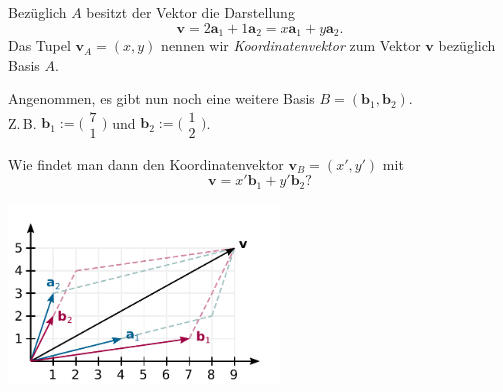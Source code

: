 \documentclass[9pt]{beamer}
\newcommand{\bv}[1]{\mathbf{#1}}
\newcommand{\icol}[1]{
  \big(\!\begin{smallmatrix}#1\end{smallmatrix}\!\big)%
}
\newcommand{\parspace}{\vspace{0.8em}}
\newcommand{\basis}[1]{#1}
\begin{document}
\begin{frame}[t]
\vspace{4em}
Bezüglich $\basis A$ besitzt der Vektor die Darstellung
\[\bv v = 2\bv a_1 + 1\bv a_2 = x\bv a_1 + y\bv a_2.
\]\pause
Das Tupel $\bv v_{\basis A} = (x,y)$ nennen wir \emph{Koordinatenvektor}
zum Vektor $\bv v$ bezüglich Basis $\basis A$.\pause

\parspace
Angenommen, es gibt nun noch eine weitere Basis $\basis B=(\bv b_1,\bv b_2)$.\\
Z.\,B. $\bv b_1:=\icol{7\\ 1}$ und $\bv b_2:=\icol{1\\ 2}$.\pause

\vspace{1.2em}
Wie findet man dann den Koordinatenvektor $\bv v_{\basis B}=(x',y')$ mit
\[\bv v = x'\bv b_1 + y'\bv b_2?\]
\end{frame}

\begin{frame}
\begin{center}
\includegraphics[width=72mm]{img/Vektor-in-Basis-AB.pdf}
\end{center}
\end{frame}
\end{document}

